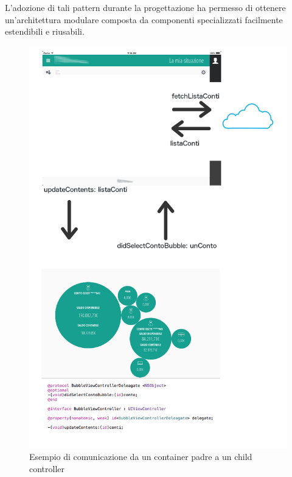 L'adozione di tali pattern durante la progettazione ha permesso di ottenere un'architettura modulare composta da componenti specializzati facilmente estendibili e riusabili.

\newpage
\begin{figure}[!htbp]
\centering
\includegraphics[scale=0.6]{dettagli/communication.png}
\caption{Esempio di comunicazione da un container padre a un child controller}
\label{fig:movimenticontainer}
\end{figure}
